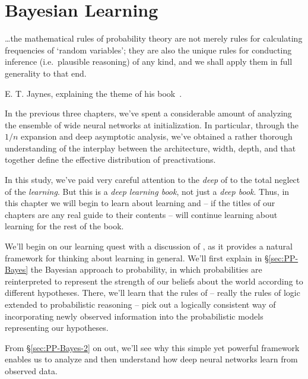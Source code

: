 
\chapter{Bayesian Learning}
\label{ch:bayesian-inference}

\epigraph{\dots the mathematical rules of probability theory are not merely rules for calculating frequencies of `random variables'; they are also the unique rules for conducting inference (i.e.~plausible reasoning) of any kind, and we shall apply them in full generality to that end.}{E. T. Jaynes, explaining the theme of his book~\cite{jaynes2003probability}.}

\noindent{}In the previous three chapters, we've spent a considerable amount of  analyzing the ensemble of wide neural networks at initialization.
In particular, through the $1/n$ expansion and
deep asymptotic analysis, we've obtained a rather thorough understanding of the interplay between the architecture, width, depth, and 
that together
define
the effective
distribution of preactivations.



In this study, we've paid very careful attention to the \emph{deep} 
of  to the total neglect of the \emph{learning}. 
But this is a \emph{deep learning book}, not just a \emph{deep book}. Thus, in this chapter we will begin to learn about learning 
and -- if the titles of our chapters are any real guide to their contents --  will continue learning about learning for
the rest of the book.


We'll begin on our learning quest with a discussion of , as it provides a natural framework for thinking about learning in general.
We'll first explain in \S\ref{sec:PP-Bayes} the Bayesian approach to probability, in which probabilities are reinterpreted to represent the strength of our beliefs about the world according to different hypotheses. There, we'll learn 
that
the rules of  
-- really the rules of logic
extended to
probabilistic
reasoning --
pick out a logically consistent way of incorporating newly observed information into the
probabilistic models representing our hypotheses.


From \S\ref{sec:PP-Bayes-2} on out, we'll see why this simple yet powerful framework enables us to analyze and then understand how deep neural networks learn from observed data.



